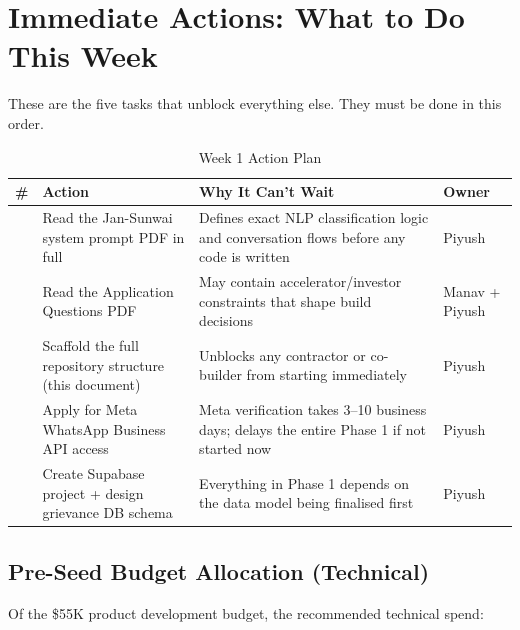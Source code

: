 \documentclass[12pt, a4paper]{article}
\begin{document}
\newpage

\section{Immediate Actions: What to Do This Week}

These are the five tasks that unblock everything else. They must be done in this order.

\begin{table}[ht]
\centering
\caption{Week 1 Action Plan}
\renewcommand{\arraystretch}{1.5}
\begin{tabularx}{\textwidth}{>{\bfseries\centering\arraybackslash}p{0.6cm} X p{2.5cm} p{2cm}}
\toprule
\rowcolor{pollitylightblue}
\textbf{\#} & \textbf{Action} & \textbf{Why It Can't Wait} & \textbf{Owner} \\
\midrule
1 & Read the Jan-Sunwai system prompt PDF in full & Defines exact NLP classification logic and conversation flows before any code is written & Piyush \\
\midrule
2 & Read the Application Questions PDF & May contain accelerator/investor constraints that shape build decisions & Manav + Piyush \\
\midrule
3 & Scaffold the full repository structure (this document) & Unblocks any contractor or co-builder from starting immediately & Piyush \\
\midrule
4 & Apply for Meta WhatsApp Business API access & Meta verification takes 3--10 business days; delays the entire Phase 1 if not started now & Piyush \\
\midrule
5 & Create Supabase project + design grievance DB schema & Everything in Phase 1 depends on the data model being finalised first & Piyush \\
\bottomrule
\end{tabularx}
\end{table}

\subsection{Pre-Seed Budget Allocation (Technical)}

Of the \$55K product development budget, the recommended technical spend:
\end{document}
